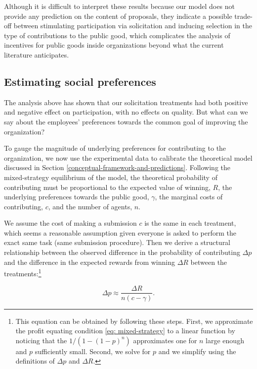 \documentclass[11pt, titlepage]{article}
\begin{document}
Although it is difficult to interpret these results because our model
does not provide any prediction on the content of proposals, they
indicate a possible trade-off between stimulating participation via
solicitation and inducing selection in the type of contributions to the
public good, which complicates the analysis of incentives for public
goods inside organizations beyond what the current literature
anticipates.

\subsection{Estimating social
preferences}\label{estimating-social-preferences}

The analysis above has shown that our solicitation treatments had both
positive and negative effect on participation, with no effects on
quality. But what can we say about the employees' preferences towards
the common goal of improving the organization?

To gauge the magnitude of underlying preferences for contributing to the
organization, we now use the experimental data to calibrate the
theoretical model discussed in Section
\ref{conceptual-framework-and-predictions}. Following the mixed-strategy
equilibrium of the model, the theoretical probability of contributing
must be proportional to the expected value of winning, \(R\), the
underlying preferences towards the public good, \(\gamma\), the marginal
costs of contributing, \(c\), and the number of agents, \(n\).

We assume the cost of making a submission \(c\) is the same in each
treatment, which seems a reasonable assumption given everyone is asked
to perform the exact same task (same submission procedure). Then we
derive a structural relationship between the observed difference in the
probability of contributing \(\Delta p\) and the difference in the
expected rewards from winning \(\Delta R\) between the
treatments:\footnote{This equation can be obtained by following these
  steps. First, we approximate the profit equating condition
  \eqref{eq: mixed-strategy} to a linear function by noticing that the
  \(1/(1-(1-p)^n)\) approximates one for \(n\) large enough and \(p\)
  sufficiently small. Second, we solve for \(p\) and we simplify using
  the definitions of \(\Delta p\) and \(\Delta R\).}

\begin{equation}
  \Delta p \approx\frac{\Delta R}{n (c - \gamma)}.
\end{equation}
\end{document}
